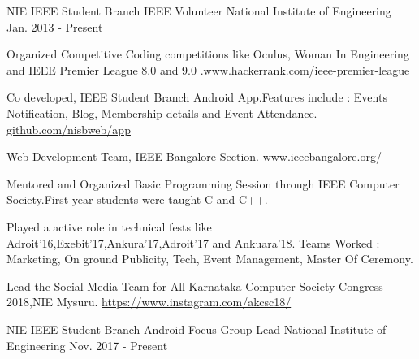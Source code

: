 \begin{cventries}
  \cventry
    {NIE IEEE Student Branch} %
    {IEEE Volunteer} %
    {National Institute of Engineering} %
    {Jan. 2013 - Present} %
    {
      \begin{cvitems} %
        \item {Organized Competitive Coding competitions like Oculus, Woman In Engineering and IEEE Premier League 8.0 and 9.0 .\href{https://www.hackerrank.com/ieee-premier-league}{www.hackerrank.com/ieee-premier-league}}
        \item { Co developed, IEEE Student Branch Android App.Features include : Events Notification, Blog, Membership details and Event Attendance.
\href{http://github.com/nisbweb/app}{github.com/nisbweb/app}}
        \item {Web Development Team, IEEE Bangalore Section.
\href{www.ieeebangalore.org/}{www.ieeebangalore.org/}}
    \item {Mentored and Organized Basic Programming Session through IEEE Computer Society.First year students were taught C and C++.}
    \item {Played a active role in technical fests like Adroit'16,Exebit'17,Ankura'17,Adroit'17 and Ankuara'18.
Teams Worked : Marketing, On ground Publicity, Tech, Event Management, Master Of Ceremony.}
    \item {Lead the Social Media Team for All Karnataka Computer Society Congress 2018,NIE Mysuru.
\newline{}\href{https://www.instagram.com/akcsc18/}{https://www.instagram.com/akcsc18/} }
      \end{cvitems}
    }

  \cventry
    {NIE IEEE Student Branch} %
    {Android Focus Group Lead} %
    {National Institute of Engineering} %
    {Nov. 2017 - Present} %
    {}


\end{cventries}
